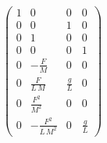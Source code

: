 \begin{equation}
\left(\begin{array}{cccc} 1 & 0 & 0 & 0\\ 0 & 0 & 1 & 0\\ 0 & 1 & 0 & 0\\ 0 & 0 & 0 & 1\\ 0 & -\frac{F}{M} & 0 & 0\\ 0 & \frac{F}{L\,M} & \frac{g}{L} & 0\\ 0 & \frac{F^2}{M^2} & 0 & 0\\ 0 & -\frac{F^2}{L\,M^2} & 0 & \frac{g}{L} \end{array}\right)
\end{equation}
